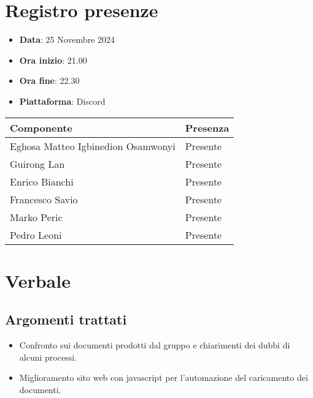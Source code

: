 \documentclass[a4paper, 12pt]{article}
\begin{document}
\section{Registro presenze}
\begin{itemize}
    \item[] \textbf{Data}: 25 Novembre 2024
    \item[] \textbf{Ora inizio}:  21.00
    \item[] \textbf{Ora fine}: 22.30
    \item[] \textbf{Piattaforma}: Discord	
\end{itemize}
\begin{table}[!h]
\centering
{\renewcommand{\arraystretch}{2}
\begin{tabularx}{\textwidth}{| X | X |}
    \hline
        \textbf{\large Componente} & 
        \textbf{\large Presenza} \\ 
    \hline 
    \hline
        Eghosa Matteo Igbinedion Osamwonyi&
        Presente \\
    \hline 
        Guirong Lan&
        Presente \\
    \hline 
        Enrico Bianchi&
        Presente \\
    \hline 
        Francesco Savio&
        Presente \\
    \hline 
        Marko Peric&
        Presente \\
    \hline 
        Pedro Leoni&
        Presente \\
    \hline 

\end{tabularx}}
\end{table}

\newpage

\section{Verbale}
\subsection{Argomenti trattati}
\begin{itemize}
    \item Confronto sui documenti prodotti dal gruppo e chiarimenti dei dubbi di alcuni processi.
    \item Miglioramento sito web con javascript per l'automazione del caricamento dei documenti.
\end{itemize}
\end{document}

